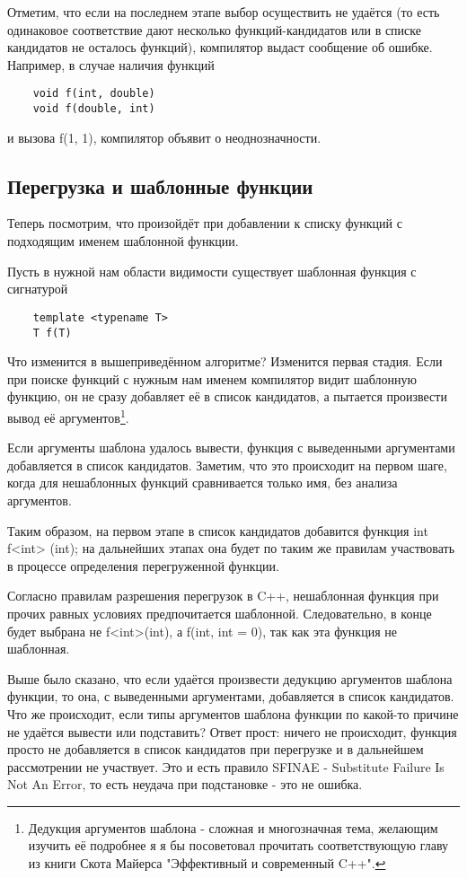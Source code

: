 	Отметим, что если на последнем этапе выбор осуществить не удаётся (то есть одинаковое соответствие дают несколько функций-кандидатов или в списке кандидатов не осталось функций), компилятор выдаст сообщение об ошибке. Например, в случае наличия функций
	
	\begin{verbatim}
	void f(int, double)
	void f(double, int)
	\end{verbatim}
	
	и вызова f(1, 1), компилятор объявит о неоднозначности.

\subsection{Перегрузка и шаблонные функции}
	Теперь посмотрим, что произойдёт при добавлении к списку функций с подходящим именем шаблонной функции.

	Пусть в нужной нам области видимости существует шаблонная функция с сигнатурой
	
	\begin{verbatim}
	template <typename T>
	T f(T)
	\end{verbatim}
	
	Что изменится в вышеприведённом алгоритме? Изменится первая стадия. Если при поиске функций с нужным нам именем компилятор видит шаблонную функцию, он не сразу добавляет её в список кандидатов, а пытается произвести вывод её аргументов\footnote{%
	Дедукция аргументов шаблона - сложная и многозначная тема, желающим изучить её подробнее я я бы посоветовал прочитать соответствующую главу из книги Скота Майерса  "Эффективный и современный C++".}.
	
	Если аргументы шаблона удалось вывести, функция с выведенными аргументами добавляется в список кандидатов. Заметим, что это происходит на первом шаге, когда для нешаблонных функций сравнивается только имя, без анализа аргументов.
	
	Таким образом, на первом этапе в список кандидатов добавится функция int f<int> (int); на дальнейших этапах она будет по таким же правилам участвовать в процессе определения перегруженной функции. 
	
	Согласно правилам разрешения перегрузок в C++, нешаблонная функция при прочих равных условиях предпочитается шаблонной. Следовательно, в конце будет выбрана не f<int>(int), а f(int, int = 0), так как эта функция не шаблонная.
	
	Выше было сказано, что если удаётся произвести дедукцию аргументов шаблона функции, то она, с выведенными аргументами, добавляется в список кандидатов. Что же происходит, если типы аргументов шаблона функции по какой-то причине не удаётся вывести или подставить? Ответ прост: ничего не происходит, функция просто не добавляется в список кандидатов при перегрузке и в дальнейшем рассмотрении не участвует. Это и есть правило SFINAE - Substitute Failure Is Not An Error, то есть неудача при подстановке - это не ошибка.
	
